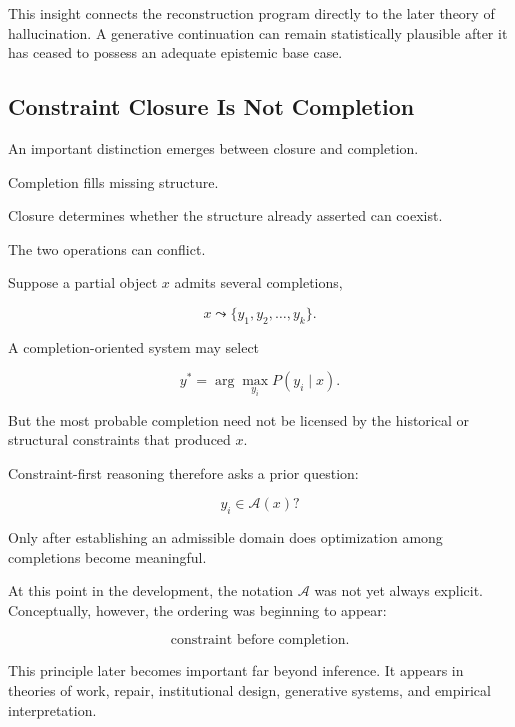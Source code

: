 \documentclass[11pt]{article}
\theoremstyle{remark}
\newcommand{\Adm}{\mathcal{A}}
\begin{document}
This insight connects the reconstruction program directly to the later theory of hallucination. A generative continuation can remain statistically plausible after it has ceased to possess an adequate epistemic base case.

\subsection{Constraint Closure Is Not Completion}

An important distinction emerges between closure and completion.

Completion fills missing structure.

Closure determines whether the structure already asserted can coexist.

The two operations can conflict.

Suppose a partial object $x$ admits several completions,

\begin{equation}
x
\leadsto
\{y_1,y_2,\ldots,y_k\}.
\end{equation}

A completion-oriented system may select

\begin{equation}
y^\ast
=
\arg\max_{y_i}
P(y_i\mid x).
\end{equation}

But the most probable completion need not be licensed by the historical or structural constraints that produced $x$.

Constraint-first reasoning therefore asks a prior question:

\begin{equation}
y_i\in\Adm(x)?
\end{equation}

Only after establishing an admissible domain does optimization among completions become meaningful.

At this point in the development, the notation $\Adm$ was not yet always explicit. Conceptually, however, the ordering was beginning to appear:

\begin{equation}
\boxed{
\text{constraint before completion}.
}
\end{equation}

This principle later becomes important far beyond inference. It appears in theories of work, repair, institutional design, generative systems, and empirical interpretation.
\end{document}
